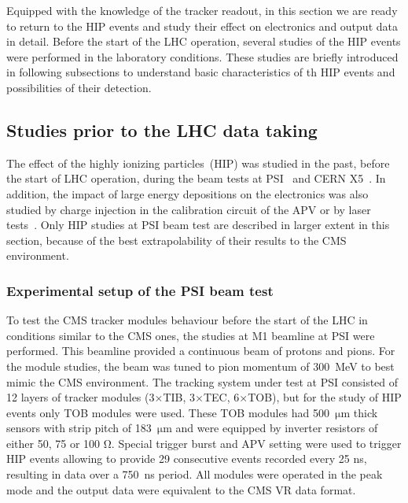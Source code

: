 Equipped with the knowledge of the tracker readout, in this section we are ready to return to the HIP events and study their effect on electronics and output data in detail. Before the start of the LHC operation, several studies of the HIP events were performed in the laboratory conditions. These studies are briefly introduced in following subsections to understand basic characteristics of th HIP events and possibilities of their detection. 


\subsection{Studies prior to the LHC data taking~\label{sec:HIPinPast}}

The effect of the highly ionizing particles~(HIP) was studied in the past, before the start of LHC operation, during the beam tests at PSI~\cite{Tomalin:2003aaa} and CERN X5~\cite{Bainbridge:2002bda}. In addition, the impact of large energy depositions on the electronics was also studied by charge injection in the calibration circuit of the APV or by laser tests~\cite{Adam:2005pz}. Only HIP studies at PSI beam test are described in larger extent in this section, because of the best extrapolability of their results to the CMS environment.

\subsubsection{Experimental setup of the PSI beam test}

To test the CMS tracker modules behaviour before the start of the LHC in conditions similar to the CMS ones, the studies at M1 beamline at PSI were performed. This beamline provided a continuous beam of protons and pions. For the module studies, the beam was tuned to pion momentum of 300~MeV to best mimic the CMS environment. The tracking system under test at PSI consisted of 12 layers of tracker modules (3$\times$TIB, 3$\times$TEC, 6$\times$TOB), but for the study of HIP events only TOB modules were used. These TOB modules had 500~$\mathrm{\mu m}$ thick sensors with strip pitch of 183~$\mathrm{\mu}$m and were equipped by inverter resistors of either 50, 75 or 100 $\mathrm{\Omega}$. Special trigger burst and APV setting were used to trigger HIP events allowing to provide 29 consecutive events recorded every 25 ns, resulting in data over a 750~ns period. All modules were operated in the peak mode and the output data were equivalent to the CMS VR data format. 


